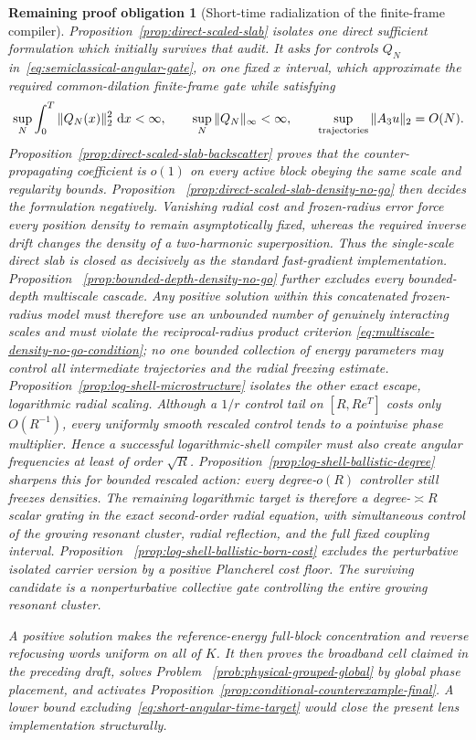 \documentclass[11pt]{article}
\newtheorem{problem}[theorem]{Remaining proof obligation}
\theoremstyle{remark}
\newcommand{\dd}{\,\mathrm d}
\begin{document}
\begin{problem}[Short-time radialization of the finite-frame compiler]
Proposition~\ref{prop:direct-scaled-slab} isolates one direct sufficient
formulation which initially survives that audit.  It asks for controls $Q_N$
in~\eqref{eq:semiclassical-angular-gate}, on one fixed $x$ interval, which
approximate the required common-dilation finite-frame gate while satisfying
\begin{equation}
 \sup_N\int_0^T\|Q_N(x)\|_2^2\,\dd x<\infty,
 \qquad
 \sup_N\|Q_N\|_\infty<\infty,
 \qquad
 \sup_{\rm trajectories}\|A_3u\|_2=O(N).
 \label{eq:semiclassical-compiler-target}
\end{equation}
Proposition~\ref{prop:direct-scaled-slab-backscatter} proves that the
counter-propagating coefficient is $o(1)$ on every active block obeying the
same scale and regularity bounds.  Proposition
~\ref{prop:direct-scaled-slab-density-no-go} then decides the formulation
negatively.  Vanishing radial cost and frozen-radius error force every
position density to remain asymptotically fixed, whereas the required inverse
drift changes the density of a two-harmonic superposition.  Thus the
single-scale direct slab is closed as decisively as the standard
fast-gradient implementation.  Proposition
~\ref{prop:bounded-depth-density-no-go} further excludes every bounded-depth
multiscale cascade.  Any positive solution within this concatenated
frozen-radius model must therefore use an unbounded number of genuinely
interacting scales and must violate the reciprocal-radius product criterion
\eqref{eq:multiscale-density-no-go-condition}; no one bounded collection of
energy parameters may control all intermediate trajectories and the radial
freezing estimate.  Proposition~\ref{prop:log-shell-microstructure} isolates
the other exact escape, logarithmic radial scaling.  Although a $1/r$ control
tail on $[R,Re^T]$ costs only $O(R^{-1})$, every uniformly smooth rescaled
control tends to a pointwise phase multiplier.  Hence a successful
logarithmic-shell compiler must also create angular frequencies at least of
order $\sqrt R$.  Proposition~\ref{prop:log-shell-ballistic-degree} sharpens
this for bounded rescaled action: every degree-$o(R)$ controller still
freezes densities.  The remaining logarithmic target is therefore a
degree-$\asymp R$ scalar grating in the exact second-order radial equation,
with simultaneous control of the growing resonant cluster, radial
reflection, and the full fixed coupling interval.  Proposition
~\ref{prop:log-shell-ballistic-born-cost} excludes the perturbative isolated
carrier version by a positive Plancherel cost floor.  The surviving candidate
is a nonperturbative collective gate controlling the entire growing resonant
cluster.

A positive solution makes the reference-energy full-block concentration
and reverse refocusing words uniform on all of $K$.  It then proves the
broadband cell claimed in the preceding draft, solves Problem
~\ref{prob:physical-grouped-global} by global phase placement, and activates
Proposition~\ref{prop:conditional-counterexample-final}.  A lower bound
excluding~\eqref{eq:short-angular-time-target} would close the present lens
implementation structurally.
\end{problem}
\end{document}
